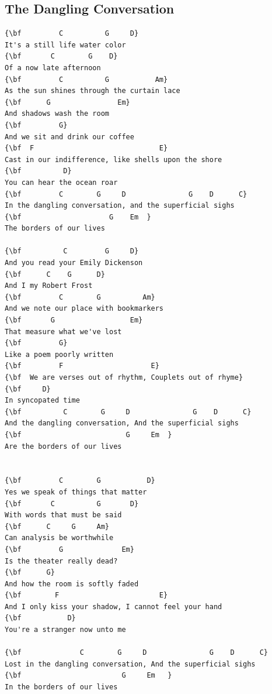 \documentclass[a4paper]{article}
\begin{document}
\subsection{The Dangling Conversation}
\begin{Verbatim}[commandchars=\\\{\}]
{\bf         C          G     D}
It's a still life water color
{\bf       C        G    D}
Of a now late afternoon
{\bf         C          G           Am}
As the sun shines through the curtain lace
{\bf      G                Em}
And shadows wash the room
{\bf         G}
And we sit and drink our coffee
{\bf  F                              E}
Cast in our indifference, like shells upon the shore
{\bf          D}
You can hear the ocean roar
{\bf         C        G     D               G    D      C}
In the dangling conversation, and the superficial sighs
{\bf                     G    Em  }
The borders of our lives

{\bf          C         G     D}
And you read your Emily Dickenson
{\bf      C    G      D}
And I my Robert Frost
{\bf         C        G          Am}
And we note our place with bookmarkers
{\bf       G                  Em}
That measure what we've lost
{\bf         G}
Like a poem poorly written
{\bf         F                     E}
{\bf  We are verses out of rhythm, Couplets out of rhyme}
{\bf     D}
In syncopated time
{\bf          C        G     D               G    D      C}
And the dangling conversation, And the superficial sighs
{\bf                         G     Em  }
Are the borders of our lives


{\bf         C        G           D}
Yes we speak of things that matter
{\bf       C          G       D}
With words that must be said
{\bf      C     G     Am}
Can analysis be worthwhile
{\bf         G              Em}
Is the theater really dead?
{\bf      G}
And how the room is softly faded
{\bf        F                        E}
And I only kiss your shadow, I cannot feel your hand
{\bf           D}
You're a stranger now unto me

{\bf              C        G     D               G    D      C}
Lost in the dangling conversation, And the superficial sighs
{\bf                        G     Em   }
In the borders of our lives

\end{Verbatim}
\newpage
\end{document}
